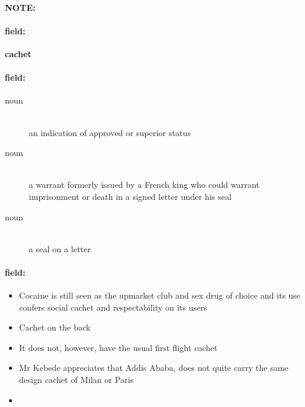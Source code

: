 \documentclass[12pt]{article}
\newenvironment{note}{\paragraph{NOTE:}}{}
\newenvironment{field}{\paragraph{field:}}{}
\begin{document}
\begin{note}
\begin{field}
\textbf{\large cachet}
\end{field}


\begin{field}
\begin{description}
\item[noun] \hfill \\ 
an indication of approved or superior status

\item[noun] \hfill \\ 
a warrant formerly issued by a French king who could warrant imprisonment or death in a signed letter under his seal

\item[noun] \hfill \\ 
a seal on a letter

\end{description}
\end{field}

\begin{field}
\begin{itemize}
\item Cocaine is still seen as the upmarket club and sex drug of choice and its use confers social cachet and respectability on its users
\item Cachet on the back
\item It does not, however, have the usual first flight cachet
\item Mr Kebede appreciates that Addis Ababa, does not quite carry the same design cachet of Milan or Paris
\item 
\end{itemize}
\end{field}
\end{note}
\end{document}
